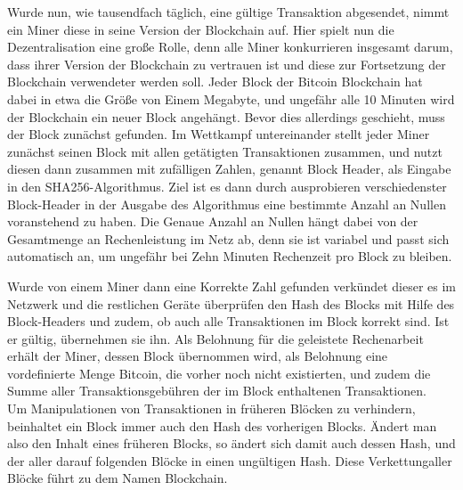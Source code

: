 \documentclass[12pt,oneside]{article}
\begin{document}
Wurde nun, wie tausendfach täglich, eine gültige Transaktion abgesendet, nimmt ein Miner diese in seine Version der Blockchain auf. Hier spielt nun die Dezentralisation eine große Rolle, denn alle Miner konkurrieren insgesamt darum, dass ihrer Version der Blockchain zu vertrauen ist und diese zur Fortsetzung der Blockchain verwendeter werden soll. Jeder Block der Bitcoin Blockchain hat dabei in etwa die Größe von Einem Megabyte, und ungefähr alle 10 Minuten wird der Blockchain ein neuer Block angehängt. Bevor dies allerdings geschieht, muss der Block zunächst \glqq gefunden\grqq. Im Wettkampf untereinander stellt jeder Miner zunächst seinen Block mit allen getätigten Transaktionen zusammen, und nutzt diesen dann zusammen mit zufälligen Zahlen, genannt Block Header, als Eingabe in den SHA256-Algorithmus. Ziel ist es dann durch ausprobieren verschiedenster Block-Header in der Ausgabe des Algorithmus eine bestimmte Anzahl an Nullen voranstehend zu haben. Die Genaue Anzahl an Nullen hängt dabei von der Gesamtmenge an Rechenleistung im Netz ab, denn sie ist variabel und passt sich automatisch an, um ungefähr bei Zehn Minuten Rechenzeit pro Block zu bleiben. \cite{fraunhofer2019}

Wurde von einem Miner dann eine Korrekte Zahl gefunden verkündet dieser es im Netzwerk und die restlichen Geräte überprüfen den Hash des Blocks mit Hilfe des Block-Headers und zudem, ob auch alle Transaktionen im Block korrekt sind. Ist er gültig, übernehmen sie ihn. Als Belohnung für die geleistete Rechenarbeit erhält der Miner, dessen Block übernommen wird, als Belohnung eine vordefinierte Menge Bitcoin, die vorher noch nicht existierten, und zudem die Summe aller Transaktionsgebühren der im Block enthaltenen Transaktionen. \\

Um Manipulationen von Transaktionen in früheren Blöcken zu verhindern, beinhaltet ein Block immer auch den Hash des vorherigen Blocks. Ändert man also den Inhalt eines früheren Blocks, so ändert sich damit auch dessen Hash, und der aller darauf folgenden Blöcke in einen ungültigen Hash. Diese \glqq Verkettung\grqq aller Blöcke führt zu dem Namen Blockchain. \cite{rosenberg2019}
\end{document}
